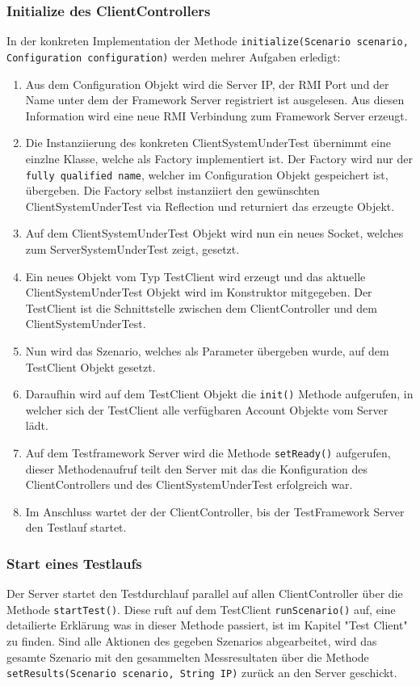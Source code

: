 \subsubsection{Initialize des ClientControllers}
In der konkreten Im\-p\-le\-men\-ta\-ti\-on der Me\-tho\-de \texttt{initialize(Scenario sce\allowbreak na\allowbreak rio, Configuration configuration)} werden mehrer Auf\-gaben er\-le\-digt:
\begin{enumerate}
\item Aus dem Configuration Objekt wird die Server IP, der RMI Port und der Name unter dem der Framework Server registriert ist ausgelesen. Aus diesen Information wird eine neue RMI Verbindung zum Framework Server erzeugt.
\item Die Instanziierung des konkreten ClientSystemUnderTest übernimmt eine einzlne Klasse, welche als Factory implementiert ist. Der Factory wird nur der \verb+fully qualified name+, welcher im Configuration Objekt gespeichert ist, übergeben. Die Factory selbst instanziiert den ge\-wünschten Client\-System\-Under\-Test via Re\-flec\-ti\-on und re\-turniert das erzeugte Objekt.
\item Auf dem ClientSystemUnderTest Objekt wird nun ein neues Socket, welches zum ServerSystemUnderTest zeigt, gesetzt.
\item Ein neues Objekt vom Typ TestClient wird erzeugt und das aktuelle ClientSystemUnderTest Objekt wird im Konstruktor mitgegeben. Der TestClient ist die Schnittstelle zwischen dem ClientController und dem ClientSystemUnderTest.
\item Nun wird das Szenario, welches als Parameter übergeben wurde, auf dem TestClient Objekt gesetzt. 
\item Daraufhin wird auf dem Test\-Client Objekt die \verb+init()+ Methode auf\-ge\-rufen, in welcher sich der TestClient alle verfügbaren Account Objekte vom Server lädt.
\item Auf dem Testframework Server wird die Me\-tho\-de \verb+setReady()+ auf\-ge\-rufen, dieser Methoden\-aufruf teilt den Server mit das die Konfiguration des ClientControllers und des ClientSystemUnderTest erfolgreich war.
\item Im Anschluss wartet der der ClientController, bis der TestFramework Server den Testlauf startet.
\end{enumerate}

\subsubsection{Start eines Testlaufs}
Der Server startet den Testdurchlauf parallel auf allen ClientController über die Methode \verb+startTest()+. Diese ruft auf dem TestClient \verb+runScenario()+ auf, eine detailierte Erklärung was in dieser Methode passiert, ist im Kapitel "Test Client" zu finden. Sind alle Aktionen des gegeben Szenarios abgearbeitet, wird das gesamte Szenario mit den gesammelten Messresultaten über die Methode \verb+setResults(Scenario scenario, String IP)+ zurück an den Server geschickt.

